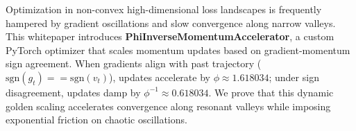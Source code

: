 \begin{abstractbox}
Optimization in non-convex high-dimensional loss landscapes is frequently hampered by gradient oscillations and slow convergence along narrow valleys. This whitepaper introduces \textbf{PhiInverseMomentumAccelerator}, a custom PyTorch optimizer that scales momentum updates based on gradient-momentum sign agreement. When gradients align with past trajectory ($\text{sgn}(g_t) == \text{sgn}(v_t)$), updates accelerate by $\phi \approx 1.618034$; under sign disagreement, updates damp by $\phi^{-1} \approx 0.618034$. We prove that this dynamic golden scaling accelerates convergence along resonant valleys while imposing exponential friction on chaotic oscillations.
\end{abstractbox}